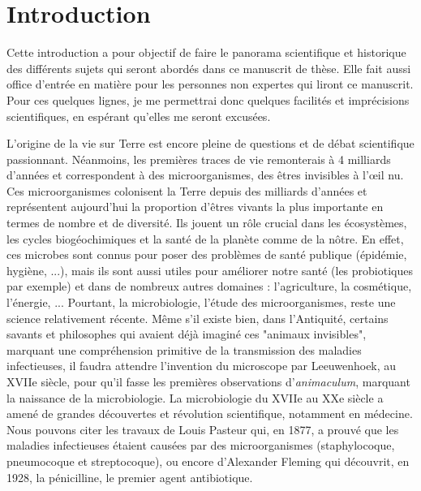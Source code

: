 \chapter*{Introduction}

Cette introduction a pour objectif de faire le panorama scientifique et historique des différents sujets qui seront abordés dans ce manuscrit de thèse. Elle fait aussi office d'entrée en matière pour les personnes non expertes qui liront ce manuscrit. Pour ces quelques lignes, je me permettrai donc quelques facilités et imprécisions scientifiques, en espérant qu'elles me seront excusées.


L'origine de la vie sur Terre est encore pleine de questions et de débat scientifique passionnant. Néanmoins, les premières traces de vie remonterais à 4 milliards d'années et correspondent à des microorganismes, des êtres invisibles à l'{\oe}il nu. Ces microorganismes colonisent la Terre depuis des milliards d'années et représentent aujourd'hui la proportion d'êtres vivants la plus importante en termes de nombre et de diversité. Ils jouent un rôle crucial dans les écosystèmes, les cycles biogéochimiques et la santé de la planète comme de la nôtre. En effet, ces microbes sont connus pour poser des problèmes de santé publique (épidémie, hygiène, ...), mais ils sont aussi utiles pour améliorer notre santé (les probiotiques par exemple) et dans de nombreux autres domaines : l'agriculture, la cosmétique, l'énergie, ... Pourtant, la microbiologie, l'étude des microorganismes, reste une science relativement récente. Même s'il existe bien, dans l'Antiquité, certains savants et philosophes qui avaient déjà imaginé ces "animaux invisibles", marquant une compréhension primitive de la transmission des maladies infectieuses, il faudra attendre l'invention du microscope par Leeuwenhoek, au XVIIe siècle, pour qu'il fasse les premières observations d'\textit{animaculum}, marquant la naissance de la microbiologie. La microbiologie du XVIIe au XXe siècle a amené de grandes découvertes et révolution scientifique, notamment en médecine. Nous pouvons citer les travaux de Louis Pasteur qui, en 1877, a prouvé que les maladies infectieuses étaient causées par des microorganismes (staphylocoque, pneumocoque et streptocoque), ou encore d'Alexander Fleming qui découvrit, en 1928, la pénicilline, le premier agent antibiotique. 


